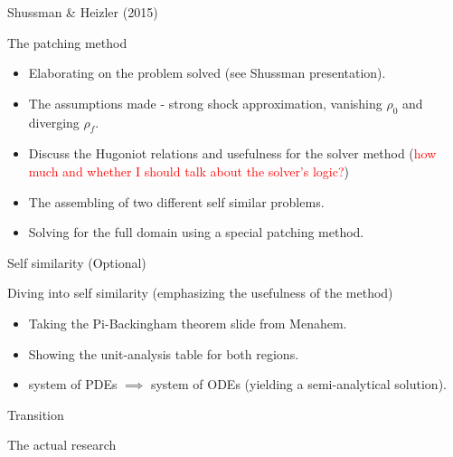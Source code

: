 \documentclass[presentation,10pt]{beamer}
\begin{document}
\begin{frame}{Shussman \& Heizler (2015)}
  \begin{block}{The patching method}
    \begin{itemize}
      \item Elaborating on the problem solved (see Shussman presentation).
      \item The assumptions made - strong shock approximation, vanishing $\rho_0$ and diverging $\rho_f$. 
      \item Discuss the Hugoniot relations and usefulness for the solver method (\textcolor{red}{how much and whether I should talk about the solver's logic?})
      \item The assembling of two different self similar problems.
      \item Solving for the full domain using a special patching method.
    \end{itemize}
  \end{block}
\end{frame}

\begin{frame}{Self similarity (Optional)}
  \begin{block}{Diving into self similarity (emphasizing the usefulness of the method)}
    \begin{itemize}
      \item Taking the Pi-Backingham theorem slide from Menahem.
      \item Showing the unit-analysis table for both regions.
      \item system of PDEs $\implies$ system of ODEs (yielding a semi-analytical solution).
    \end{itemize}
  \end{block}
\end{frame}

\begin{frame}{Transition}
  \begin{block}{The actual research}
  \end{block}
\end{frame}
\end{document}
